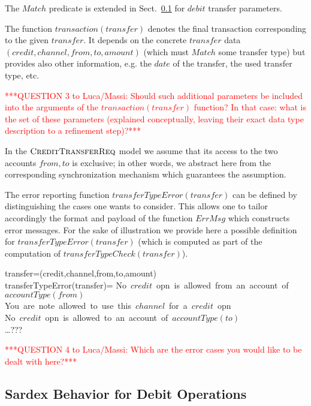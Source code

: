 The $Match$ predicate is extended in Sect.~\ref{sect:debitop} for $debit$ transfer parameters.

The function $transaction(transfer)$ denotes the final transaction corresponding to the given $transfer$. It depends on the concrete $transfer$ data $(credit,channel,from,to,amount)$ (which must $Match$ some transfer type) but provides also other information, e.g. the $date$ of the transfer, the used transfer type, etc.

\vspace{12pt}
\textcolor{red}{***QUESTION 3 to Luca/Massi: Should such additional parameters be included
	into the arguments of the $transaction(transfer)$ function? In that case: what is the set of these parameters (explained conceptually, leaving their exact data type description to a refinement step)?***}
\vspace{12pt}

In the $\hbox{\sc CreditTransferReq}$ model we assume that its access to the two accounts $from, to$ is exclusive; in other words, we abstract here from the corresponding synchronization mechanism which guarantees the assumption.

The error reporting function $transferTypeError(transfer)$ can be defined by distinguishing the cases one wants to consider. This allows one to tailor accordingly the format and payload of the function  $ErrMsg$ which constructs error messages. For the sake of illustration we provide here a possible definition for  $transferTypeError(transfer)$ (which is computed as part of the computation of $transferTypeCheck(transfer)$).

\begin{asm}
\LET transfer=(credit,channel,from,to,amount) \\
transferTypeError(transfer)=\+
  \mbox{No $credit$ opn is allowed from an account of $accountType(from)$}\\ 
  \OR \mbox{You are note allowed to use this $channel$ for a $credit$ opn}\\
  \OR \mbox{No $credit$ opn is allowed to an account of $accountType(to)$}\\
    \OR \ldots ???
\end{asm}
\vspace{12pt}
\textcolor{red}{***QUESTION 4 to Luca/Massi: Which are the error cases you would like to be dealt with here?***}
\vspace{12pt}


\subsection{Sardex Behavior for Debit Operations}
\label{sect:debitop}

